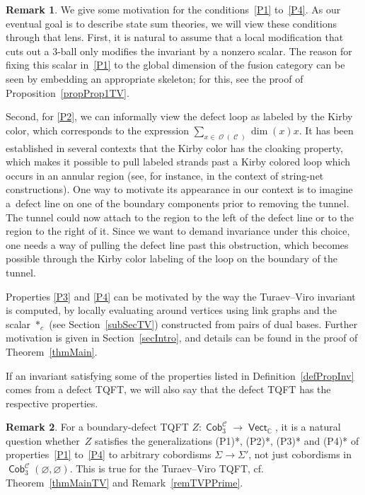\documentclass[pdftex]{sigma}
\DeclareMathOperator{\vect}{\mathsf{Vect}}
\DeclareMathOperator{\C}{\mathbb{C}}
\DeclareMathOperator{\Cob}{\mathsf{Cob}}
\DeclareMathOperator{\calc}{\mathcal{C}}
\DeclareMathOperator{\calo}{\mathcal{O}}
\numberwithin{equation}{section}
\theoremstyle{definition}
\newtheorem{Remark}[Remark]{Remark}
\begin{document}
\begin{Remark}
 \label{remDef}
 We give some motivation for the conditions~\ref{P1} to~\ref{P4}. As our eventual goal is to describe state sum theories, we will view these conditions through that lens. First, it is natural to assume that a local modification that cuts out a 3-ball only modifies the invariant by a nonzero scalar. The reason for fixing this scalar in~\ref{P1} to the global dimension of the fusion category can be seen by embedding an appropriate skeleton; for this, see the proof of Proposition~\ref{propProp1TV}.

 Second, for \ref{P2}, we can informally view the defect loop as labeled by the Kirby color, which corresponds to the expression $\sum_{x \in \calo(\calc)}\dim(x) x$. It has been established in several contexts that the Kirby color has the cloaking property, which makes it possible to pull labeled strands past a Kirby colored loop which occurs in an annular region (see, for instance, \cite{Ba, CGPV} in the context of string-net constructions). One way to motivate its appearance in our context is to imagine a~defect line on one of the boundary components prior to removing the tunnel. The tunnel could now attach to the region to the left of the defect line or to the region to the right of it. Since we want to demand invariance under this choice, one needs a way of pulling the defect line past this obstruction, which becomes possible through the Kirby color labeling of the loop on the boundary of the tunnel.

 Properties \ref{P3} and \ref{P4} can be motivated by the way the Turaev–Viro invariant is computed, by locally evaluating around vertices using link graphs and the scalar $*_c$ (see Section~\ref{subSecTV}) constructed from pairs of dual bases. Further motivation is given in Section~\ref{secIntro}, and details can be found in the proof of Theorem~\ref{thmMain}.
\end{Remark}
If an invariant satisfying some of the properties listed in Definition~\ref{defPropInv} comes from a defect TQFT, we will also say that the defect TQFT has the respective properties.
\begin{Remark}
 \label{remPPrime}
 For a boundary-defect TQFT $Z\colon \Cob_3^{\calc} \!\rightarrow\! \vect_{\C}$, it is a natural question whether~$Z$ satisfies the generalizations (P1)*, (P2)*, (P3)* and (P4)* of properties~\ref{P1} to~\ref{P4} to arbitrary cobordisms $\Sigma \rightarrow \Sigma'$, not just cobordisms in $\Cob_3^{\calc}(\varnothing, \varnothing)$. This is true for the Turaev--Viro TQFT, cf. Theorem~\ref{thmMainTV} and Remark~\ref{remTVPPrime}.
\end{Remark}
\end{document}
